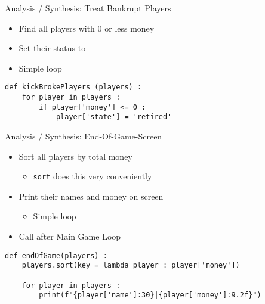 
\begin{frame}[fragile]{Analysis / Synthesis: Treat Bankrupt Players}
%
\begin{itemize}
\item Find all players with 0 or less money
\item Set their status to 
\item Simple  loop
\end{itemize}
%
\begin{codebox}
\begin{verbatim}
def kickBrokePlayers (players) :
    for player in players :
        if player['money'] <= 0 :
            player['state'] = 'retired'
\end{verbatim}
\end{codebox}
%
\end{frame}


\begin{frame}[fragile]{Analysis / Synthesis: End-Of-Game-Screen}
%
\begin{itemize}
\item Sort all players by total money
	\begin{itemize}
	\item \texttt{sort} does this very conveniently
	\end{itemize}
\item Print their names and money on screen
	\begin{itemize}
	\item Simple  loop
	\end{itemize}
\item Call after Main Game Loop
\end{itemize}
%
\begin{codebox}
\begin{verbatim}
def endOfGame(players) :
    players.sort(key = lambda player : player['money'])
    
    for player in players :
        print(f"{player['name']:30}|{player['money']:9.2f}")
\end{verbatim}
\end{codebox}
%
\end{frame}